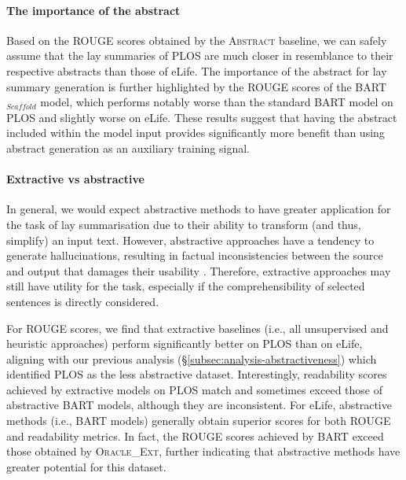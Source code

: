 \documentclass[11pt]{article}
\begin{document}
\paragraph{The importance of the abstract}
Based on the ROUGE scores obtained by the \textsc{Abstract} baseline, we can safely assume that the lay summaries of PLOS are much closer in resemblance to their respective abstracts than those of eLife. 
The importance of the abstract for lay summary generation is further highlighted by the ROUGE scores of the \textsc{BART}$_{Scaffold}$ model, which performs notably worse than the standard \textsc{BART} model on PLOS and slightly worse on eLife. These results suggest that having the abstract included within the model input provides significantly more benefit than using abstract generation as an auxiliary training signal.

\paragraph{Extractive vs abstractive}
In general, we would expect abstractive methods to have greater application for the task of lay summarisation due to their ability to transform (and thus, simplify) an input text. However, abstractive approaches have a tendency to generate hallucinations, resulting in factual inconsistencies between the source and output that damages their usability \citep{Maynez2020-xd}. Therefore, extractive approaches may still have utility for the task, especially if the comprehensibility of selected sentences is directly considered. 

For ROUGE scores, we find that extractive baselines (i.e., all unsupervised and heuristic approaches) perform significantly better on PLOS than on eLife, aligning with our previous analysis (\S\ref{subsec:analysis-abstractiveness}) which identified PLOS as the less abstractive dataset.
Interestingly, readability scores achieved by extractive models on PLOS match and sometimes exceed those of abstractive \textsc{BART} models, although they are inconsistent. 
For eLife, abstractive methods (i.e., \textsc{BART} models) generally obtain superior scores for both ROUGE and readability metrics. In fact, the ROUGE scores achieved by \textsc{BART} exceed those obtained by \textsc{Oracle\_Ext}, further indicating that abstractive methods have greater potential for this dataset.
\end{document}
